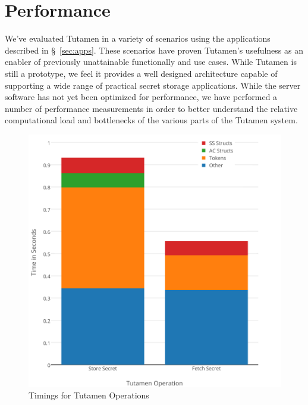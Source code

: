 \section{Performance}
\label{sec:performace}

We've evaluated Tutamen in a variety of scenarios using the
applications described in \S~\ref{sec:apps}. These scenarios have
proven Tutamen's usefulness as an enabler of previously unattainable
functionally and use cases. While Tutamen is still a prototype, we
feel it provides a well designed architecture capable of supporting a
wide range of practical secret storage applications. While the server
software has not yet been optimized for performance, we have performed
a number of performance measurements in order to better understand the
relative computational load and bottlenecks of the various parts of
the Tutamen system.

\begin{figure}[th]
  \centering
  \includegraphics[width=\columnwidth]{./figs/png/chart-combined-timings.png}
  \caption{Timings for Tutamen Operations}
  \label{fig:eval:timings}
\end{figure}

